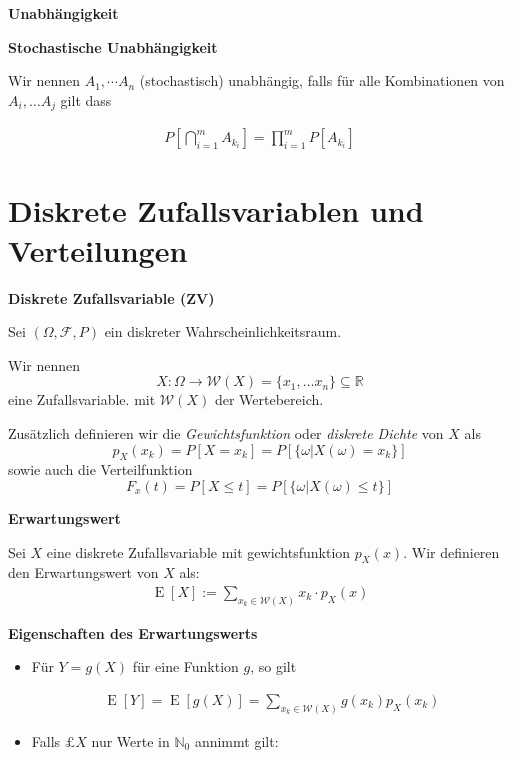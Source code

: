 \documentclass[25pt]{sciposter}
\newcommand{\R}{\mathbb{R}}
\newcommand{\N}{\mathbb{N}}
\newcommand{\F}{\mathcal{F}}
\newcommand{\W}{\mathcal{W}}
\newcommand{\E}{\operatorname{E}}
\newenvironment{method}[1]{\begin{mdframed}[backgroundcolor=blue!10,innertopmargin=15pt, innerbottommargin=15pt,nobreak=true]
		\textbf{#1 }
	}
	{ 
	\end{mdframed}
}
\newenvironment{thm}[1]{\begin{mdframed}[backgroundcolor=pink!50,innertopmargin=15pt, innerbottommargin=15pt, nobreak=true]
		\textbf{#1 }
	}
	{ 
	\end{mdframed}
}
\begin{document}
\begin{multicols}{3}
\begin{method}{Unabhängigkeit}
	
\end{method}

\begin{method}{Stochastische Unabhängigkeit}
	Wir nennen $A_1,\cdots A_n$ (stochastisch) unabhängig, falls für alle Kombinationen von $A_i, \ldots A_j$ gilt dass
	
	\begin{align*}
	P\left[\bigcap_{i=1}^{m} A_{k_i} \right] = \prod_{i=1}^{m}P[A_{k_i}]
	\end{align*}
	
\end{method}



\section{Diskrete Zufallsvariablen und Verteilungen}



\begin{method}{Diskrete Zufallsvariable (ZV)}
	Sei $(\Omega, \F, P)$ ein diskreter Wahrscheinlichkeitsraum.
	
	Wir nennen 
	$$X:\Omega \to \W(X) = \{x_1,\ldots x_n\}\subseteq \R$$
	eine Zufallsvariable. mit $\W(X)$ der Wertebereich.
	 
	Zusätzlich definieren wir die \textit{Gewichtsfunktion} oder \textit{diskrete Dichte} von $X$ als 
	$$p_X(x_k) = P[X = x_k] = P[\{ \omega | X(\omega) = x_k \}]$$
	sowie auch die Verteilfunktion 
	$$F_x(t) = P[X\leq t] = P[\{\omega | X(\omega) \leq t\}]$$

\end{method}


\begin{method}{Erwartungswert}
	Sei $X$ eine diskrete Zufallsvariable mit gewichtsfunktion $p_X(x)$. Wir definieren den Erwartungswert von $X$ als:
	\begin{align*}
		\E[X] := \sum_{x_k\in \W(X)} x_k \cdot p_X(x)
	\end{align*}
\end{method}


\begin{thm}{Eigenschaften des Erwartungswerts}
\begin{itemize}
	\item Für $Y = g(X)$ für eine Funktion $g$, so gilt 
	
	\begin{align*}
		\E[Y] = \E[g(X)] = \sum_{x_k\in\W(X)} g(x_k)p_X(x_k)
	\end{align*}
	\item Falls $£X$ nur Werte in $\N_0$ annimmt gilt:
	

\end{itemize}
\end{thm}
\end{multicols}
\end{document}
